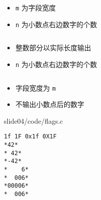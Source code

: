 \begin{frame}[fragile]
\begin{lstlisting}[backgroundcolor=\color{red!20}]
%m.nf     %m.ne      %m.nE
\end{lstlisting}

\begin{itemize}
\item \lstinline|m| 为字段宽度
\item \lstinline|n| 为小数点右边数字的个数
\end{itemize} \pause 

\begin{lstlisting}[backgroundcolor=\color{red!20}] 
%.nf
\end{lstlisting}

\begin{itemize}
\item 整数部分以实际长度输出
\item \lstinline|n| 为小数点右边数字的个数
\end{itemize} \pause 

\begin{lstlisting}[backgroundcolor=\color{red!20}] 
%m.f
\end{lstlisting}

\begin{itemize}
\item 字段宽度为 \lstinline|m|
\item 不输出小数点后的数字
\end{itemize}
\end{frame}

\begin{frame}\ft{\secname}
  
  {slide04/code/flags.c}    
\end{frame}

\begin{frame}[fragile]\ft{\secname}
\begin{lstlisting}[showspaces=true]
1f 1F 0x1f 0X1F
*42*
* 42*
*-42*
*    6*
*  006*
*00006*
*  006*
\end{lstlisting}
\end{frame}


